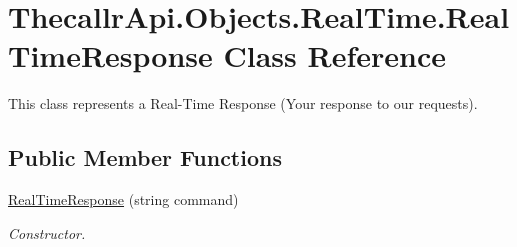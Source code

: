 \hypertarget{class_thecallr_api_1_1_objects_1_1_real_time_1_1_real_time_response}{\section{Thecallr\+Api.\+Objects.\+Real\+Time.\+Real\+Time\+Response Class Reference}
\label{class_thecallr_api_1_1_objects_1_1_real_time_1_1_real_time_response}
}


This class represents a Real-\/\+Time Response (Your response to our requests).  


\subsection*{Public Member Functions}
\begin{DoxyCompactItemize}
\item 
\hyperlink{class_thecallr_api_1_1_objects_1_1_real_time_1_1_real_time_response_a566fcea5067602c09530218cfa6b5dbd}{Real\+Time\+Response} (string command)
\begin{DoxyCompactList}\small\item\em Constructor. \end{DoxyCompactList}\end{DoxyCompactItemize}
